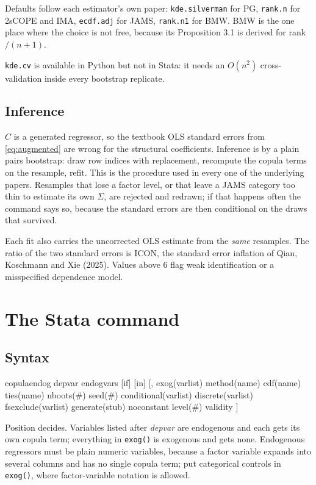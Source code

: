 \documentclass[11pt]{article}
\newcommand{\stcmd}[1]{\texttt{#1}}
\begin{document}
Defaults follow each estimator's own paper: \stcmd{kde.silverman} for PG,
\stcmd{rank.n} for 2sCOPE and IMA, \stcmd{ecdf.adj} for JAMS, \stcmd{rank.n1}
for BMW. BMW is the one place where the choice is not free, because its
Proposition 3.1 is derived for rank$/(n{+}1)$.

\stcmd{kde.cv} is available in Python but not in Stata: it needs an $O(n^2)$
cross-validation inside every bootstrap replicate.

\subsection{Inference}

$C$ is a generated regressor, so the textbook OLS standard errors from
\eqref{eq:augmented} are wrong for the structural coefficients. Inference is
by a plain pairs bootstrap: draw row indices with replacement, recompute the
copula terms on the resample, refit. This is the procedure used in every one
of the underlying papers. Resamples that lose a factor level, or that leave a
JAMS category too thin to estimate its own $\Sigma$, are rejected and redrawn;
if that happens often the command says so, because the standard errors are
then conditional on the draws that survived.

Each fit also carries the uncorrected OLS estimate from the \emph{same}
resamples. The ratio of the two standard errors is ICON, the standard error
inflation of Qian, Koschmann and Xie (2025). Values above 6 flag weak
identification or a misspecified dependence model.

\section{The Stata command}

\subsection{Syntax}

\begin{stata}
copulaendog depvar endogvars [if] [in] [, exog(varlist) method(name)
    cdf(name) ties(name) nboots(#) seed(#) conditional(varlist)
    discrete(varlist) fsexclude(varlist) generate(stub) noconstant
    level(#) validity ]
\end{stata}

Position decides. Variables listed after \emph{depvar} are endogenous and each
gets its own copula term; everything in \stcmd{exog()} is exogenous and gets
none. Endogenous regressors must be plain numeric variables, because a factor
variable expands into several columns and has no single copula term; put
categorical controls in \stcmd{exog()}, where factor-variable notation is
allowed.
\end{document}
